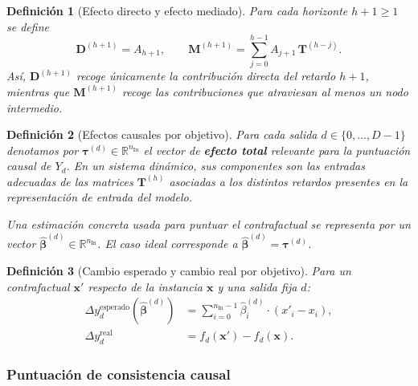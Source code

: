 \documentclass[12pt]{report} %
\newtheorem{definition}{Definición}
\begin{document}
\begin{definition}[Efecto directo y efecto mediado]
    Para cada horizonte $h+1 \geq 1$ se define
    \begin{equation}
        \mathbf{D}^{(h+1)} = A_{h+1},
        \qquad
        \mathbf{M}^{(h+1)} = \sum_{j=0}^{h-1} A_{j+1}\,\mathbf{T}^{(h-j)}.
        \label{eq:formal_direct_mediated}
    \end{equation}
    Así, $\mathbf{D}^{(h+1)}$ recoge únicamente la contribución directa del retardo $h+1$, mientras que $\mathbf{M}^{(h+1)}$ recoge las contribuciones que atraviesan al menos un nodo intermedio.
\end{definition}

\begin{definition}[Efectos causales por objetivo]
    Para cada salida $d \in \{0, \ldots, D-1\}$ denotamos por $\boldsymbol{\tau}^{(d)} \in \mathbb{R}^{n_{\text{In}}}$ el vector de \textbf{efecto total} relevante para la puntuación causal de $Y_d$. En un sistema dinámico, sus componentes son las entradas adecuadas de las matrices $\mathbf{T}^{(h)}$ asociadas a los distintos retardos presentes en la representación de entrada del modelo.

    Una estimación concreta usada para puntuar el contrafactual se representa por un vector $\widehat{\boldsymbol{\beta}}^{(d)} \in \mathbb{R}^{n_{\text{In}}}$. El caso ideal corresponde a $\widehat{\boldsymbol{\beta}}^{(d)} = \boldsymbol{\tau}^{(d)}$.
\end{definition}

\begin{definition}[Cambio esperado y cambio real por objetivo]
    Para un contrafactual $\mathbf{x}'$ respecto de la instancia $\mathbf{x}$ y una salida fija $d$:
    \begin{align}
        \Delta y_d^{\text{esperado}}\!\left(\widehat{\boldsymbol{\beta}}^{(d)}\right)
         & = \sum_{i=0}^{n_{\text{In}}-1} \widehat{\beta}_i^{(d)} \cdot (x'_i - x_i), \label{eq:formal_expected_delta} \\
        \Delta y_d^{\text{real}}
         & = f_d(\mathbf{x}') - f_d(\mathbf{x}). \label{eq:formal_actual_delta}
    \end{align}
\end{definition}

\subsubsection{Puntuación de consistencia causal}
\end{document}
